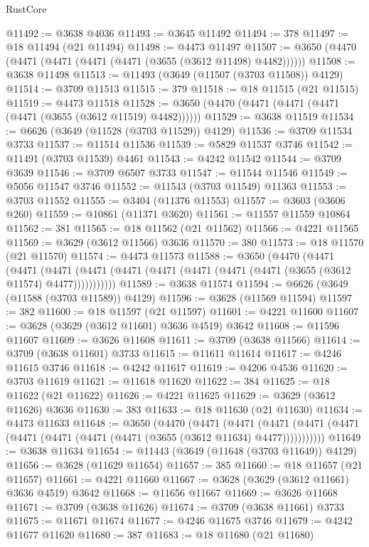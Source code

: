 \begin{lexlean}{RustCore}
\begin{coremodule}
@11492 := @3638 @4036
@11493 := @3645 @11492
@11494 := 378
@11497 := @18 @11494 (@21 @11494)
@11498 := @4473 @11497
@11507 := @3650 (@4470 (@4471 (@4471 (@4471 (@4471 (@3655 (@3612 @11498) @4482))))))
@11508 := @3638 @11498
@11513 := @11493 (@3649 (@11507 (@3703 @11508)) @4129)
@11514 := @3709 @11513
@11515 := 379
@11518 := @18 @11515 (@21 @11515)
@11519 := @4473 @11518
@11528 := @3650 (@4470 (@4471 (@4471 (@4471 (@4471 (@3655 (@3612 @11519) @4482))))))
@11529 := @3638 @11519
@11534 := @6626 (@3649 (@11528 (@3703 @11529)) @4129)
@11536 := @3709 @11534 @3733
@11537 := @11514 @11536
@11539 := @5829 @11537 @3746
@11542 := @11491 (@3703 @11539) @4461
@11543 := @4242 @11542
@11544 := @3709 @3639
@11546 := @3709 @6507 @3733
@11547 := @11544 @11546
@11549 := @5056 @11547 @3746
@11552 := @11543 (@3703 @11549) @11363
@11553 := @3703 @11552
@11555 := @3404 (@11376 @11553)
@11557 := @3603 (@3606 @260)
@11559 := @10861 (@11371 @3620)
@11561 := @11557 @11559 @10864
@11562 := 381
@11565 := @18 @11562 (@21 @11562)
@11566 := @4221 @11565
@11569 := @3629 (@3612 @11566) @3636
@11570 := 380
@11573 := @18 @11570 (@21 @11570)
@11574 := @4473 @11573
@11588 := @3650
    (@4470
      (@4471
        (@4471
          (@4471 (@4471 (@4471 (@4471 (@4471 (@4471 (@4471 (@3655 (@3612 @11574) @4477)))))))))))
@11589 := @3638 @11574
@11594 := @6626 (@3649 (@11588 (@3703 @11589)) @4129)
@11596 := @3628 (@11569 @11594)
@11597 := 382
@11600 := @18 @11597 (@21 @11597)
@11601 := @4221 @11600
@11607 := @3628 (@3629 (@3612 @11601) @3636 @4519) @3642
@11608 := @11596 @11607
@11609 := @3626 @11608
@11611 := @3709 (@3638 @11566)
@11614 := @3709 (@3638 @11601) @3733
@11615 := @11611 @11614
@11617 := @4246 @11615 @3746
@11618 := @4242 @11617
@11619 := @4206 @4536
@11620 := @3703 @11619
@11621 := @11618 @11620
@11622 := 384
@11625 := @18 @11622 (@21 @11622)
@11626 := @4221 @11625
@11629 := @3629 (@3612 @11626) @3636
@11630 := 383
@11633 := @18 @11630 (@21 @11630)
@11634 := @4473 @11633
@11648 := @3650
    (@4470
      (@4471
        (@4471
          (@4471 (@4471 (@4471 (@4471 (@4471 (@4471 (@4471 (@3655 (@3612 @11634) @4477)))))))))))
@11649 := @3638 @11634
@11654 := @11443 (@3649 (@11648 (@3703 @11649)) @4129)
@11656 := @3628 (@11629 @11654)
@11657 := 385
@11660 := @18 @11657 (@21 @11657)
@11661 := @4221 @11660
@11667 := @3628 (@3629 (@3612 @11661) @3636 @4519) @3642
@11668 := @11656 @11667
@11669 := @3626 @11668
@11671 := @3709 (@3638 @11626)
@11674 := @3709 (@3638 @11661) @3733
@11675 := @11671 @11674
@11677 := @4246 @11675 @3746
@11679 := @4242 @11677 @11620
@11680 := 387
@11683 := @18 @11680 (@21 @11680)

\end{coremodule}
\end{lexlean}
